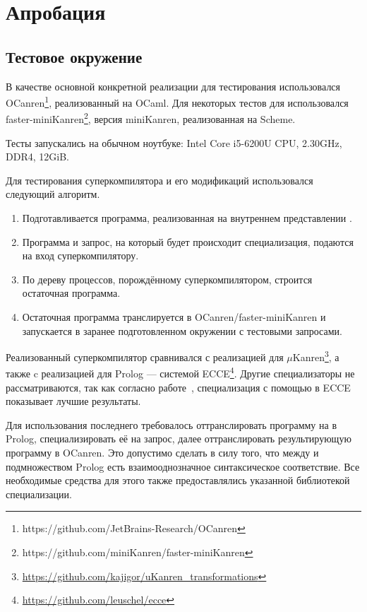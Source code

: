 \section{Апробация}
\label{sec:testing}

\subsection{Тестовое окружение}

В качестве основной конкретной реализации \ukanren для тестирования
использовался OCanren\footnote{https://github.com/JetBrains-Research/OCanren}\cite{ocanren},
реализованный на OCaml\cite{ocanren}.
Для некоторых тестов для использовался faster-miniKanren\footnote{https://github.com/miniKanren/faster-miniKanren},
версия miniKanren, реализованная на Scheme.

Тесты запускались на обычном ноутбуке: Intel Core i5-6200U CPU, 2.30GHz, DDR4, 12GiB.

Для тестирования суперкомпилятора и его модификаций использовался следующий алгоритм.
\begin{enumerate}
\item Подготавливается программа, реализованная на внутреннем представлении \ukanren.
\item Программа и запрос, на который будет происходит специализация, подаются на вход суперкомпилятору.
\item По дереву процессов, порождённому суперкомпилятором, строится остаточная программа.
\item Остаточная программа транслируется в OCanren/faster-miniKanren и
      запускается в заранее подготовленном окружении с тестовыми запросами.
\end{enumerate}


Реализованный суперкомпилятор сравнивался с реализацией \forcpd для $\mu$Kanren\footnote{\url{https://github.com/kajigor/uKanren_transformations}},
а также c реализацией \forcpd для Prolog --- системой ECCE\footnote{\url{https://github.com/leuschel/ecce}}.
Другие специализаторы не рассматриваются, так как согласно работе~\cite{controlPoly}, специализация с
помощью \forcpd в ECCE показывает лучшие результаты.

Для использования последнего требовалось оттранслировать программу на \ukanren в Prolog, специализировать
её на запрос, далее оттранслировать результирующую программу в OCanren.
Это допустимо сделать в силу того, что между \ukanren и подмножеством Prolog есть
взаимооднозначное синтаксическое соответствие. 
Все необходимые средства для этого также предоставлялись указанной библиотекой специализации.


